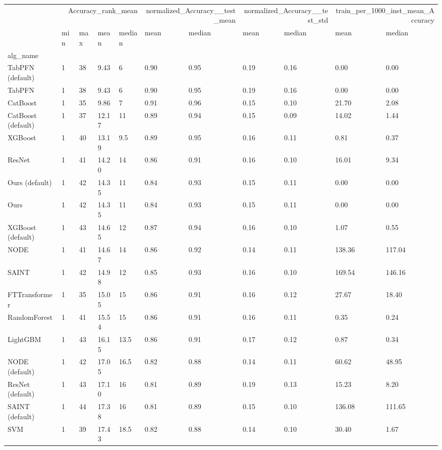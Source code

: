 \begin{tabular}{lllllllllll}
\toprule
 & \multicolumn{4}{r}{Accuracy_rank_mean} & \multicolumn{2}{r}{normalized_Accuracy__test_mean} & \multicolumn{2}{r}{normalized_Accuracy__test_std} & \multicolumn{2}{r}{train_per_1000_inst_mean_Accuracy} \\
 & min & max & mean & median & mean & median & mean & median & mean & median \\
alg_name &  &  &  &  &  &  &  &  &  &  \\
\midrule
TabPFN (default) & 1 & 38 & 9.43 & 6 & 0.90 & 0.95 & 0.19 & 0.16 & 0.00 & 0.00 \\
TabPFN & 1 & 38 & 9.43 & 6 & 0.90 & 0.95 & 0.19 & 0.16 & 0.00 & 0.00 \\
CatBoost & 1 & 35 & 9.86 & 7 & 0.91 & 0.96 & 0.15 & 0.10 & 21.70 & 2.08 \\
CatBoost (default) & 1 & 37 & 12.17 & 11 & 0.89 & 0.94 & 0.15 & 0.09 & 14.02 & 1.44 \\
XGBoost & 1 & 40 & 13.19 & 9.5 & 0.89 & 0.95 & 0.16 & 0.11 & 0.81 & 0.37 \\
ResNet & 1 & 41 & 14.20 & 14 & 0.86 & 0.91 & 0.16 & 0.10 & 16.01 & 9.34 \\
Ours (default) & 1 & 42 & 14.35 & 11 & 0.84 & 0.93 & 0.15 & 0.11 & 0.00 & 0.00 \\
Ours & 1 & 42 & 14.35 & 11 & 0.84 & 0.93 & 0.15 & 0.11 & 0.00 & 0.00 \\
XGBoost (default) & 1 & 43 & 14.65 & 12 & 0.87 & 0.94 & 0.16 & 0.10 & 1.07 & 0.55 \\
NODE & 1 & 41 & 14.67 & 14 & 0.86 & 0.92 & 0.14 & 0.11 & 138.36 & 117.04 \\
SAINT & 1 & 42 & 14.98 & 12 & 0.85 & 0.93 & 0.16 & 0.10 & 169.54 & 146.16 \\
FTTransformer & 1 & 35 & 15.05 & 15 & 0.86 & 0.91 & 0.16 & 0.12 & 27.67 & 18.40 \\
RandomForest & 1 & 41 & 15.54 & 15 & 0.86 & 0.91 & 0.16 & 0.11 & 0.35 & 0.24 \\
LightGBM & 1 & 43 & 16.15 & 13.5 & 0.86 & 0.91 & 0.17 & 0.12 & 0.87 & 0.34 \\
NODE (default) & 1 & 42 & 17.05 & 16.5 & 0.82 & 0.88 & 0.14 & 0.11 & 60.62 & 48.95 \\
ResNet (default) & 1 & 43 & 17.10 & 16 & 0.81 & 0.89 & 0.19 & 0.13 & 15.23 & 8.20 \\
SAINT (default) & 1 & 44 & 17.38 & 16 & 0.81 & 0.89 & 0.15 & 0.10 & 136.08 & 111.65 \\
SVM & 1 & 39 & 17.43 & 18.5 & 0.82 & 0.88 & 0.14 & 0.10 & 30.40 & 1.67 \\

\end{tabular}
